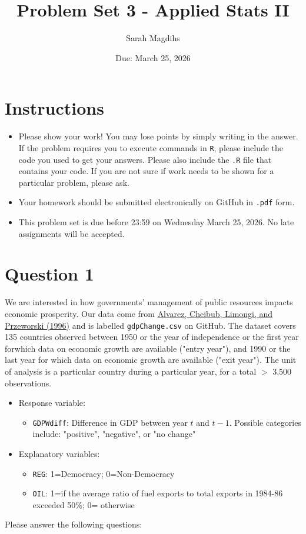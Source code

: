 \documentclass[12pt,letterpaper]{article}
\title{Problem Set 3 - Applied Stats II}
\date{Due: March 25, 2026}
\author{Sarah Magdihs}
\begin{document}
	\maketitle
	\section*{Instructions}
	\begin{itemize}
	\item Please show your work! You may lose points by simply writing in the answer. If the problem requires you to execute commands in \texttt{R}, please include the code you used to get your answers. Please also include the \texttt{.R} file that contains your code. If you are not sure if work needs to be shown for a particular problem, please ask.
\item Your homework should be submitted electronically on GitHub in \texttt{.pdf} form.
\item This problem set is due before 23:59 on Wednesday March 25, 2026. No late assignments will be accepted.
	\end{itemize}

	\vspace{.25cm}
\section*{Question 1}
\vspace{.25cm}
\noindent We are interested in how governments' management of public resources impacts economic prosperity. Our data come from \href{https://www.researchgate.net/profile/Adam_Przeworski/publication/240357392_Classifying_Political_Regimes/links/0deec532194849aefa000000/Classifying-Political-Regimes.pdf}{Alvarez, Cheibub, Limongi, and Przeworski (1996)} and is labelled \texttt{gdpChange.csv} on GitHub. The dataset covers 135 countries observed between 1950 or the year of independence or the first year forwhich data on economic growth are available ("entry year"), and 1990 or the last year for which data on economic growth are available ("exit year"). The unit of analysis is a particular country during a particular year, for a total $>$ 3,500 observations. 

\begin{itemize}
	\item
	Response variable: 
	\begin{itemize}
		\item \texttt{GDPWdiff}: Difference in GDP between year $t$ and $t-1$. Possible categories include: "positive", "negative", or "no change"
	\end{itemize}
	\item
	Explanatory variables: 
	\begin{itemize}
		\item
		\texttt{REG}: 1=Democracy; 0=Non-Democracy
		\item
		\texttt{OIL}: 1=if the average ratio of fuel exports to total exports in 1984-86 exceeded 50\%; 0= otherwise
	\end{itemize}
	
\end{itemize}
\newpage
\noindent Please answer the following questions:
\end{document}
